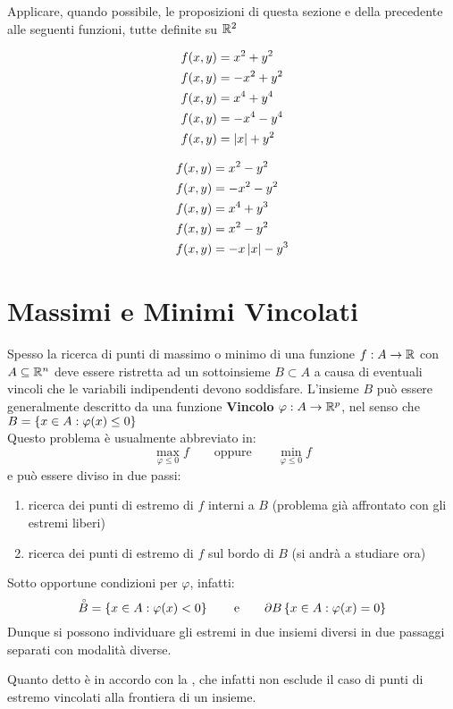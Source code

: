 \begin{exercise}
	Applicare, quando possibile, le proposizioni di questa sezione e della precedente alle seguenti funzioni, tutte definite su $\mathbb{R}^2$\\
	\begin{minipage}{0.49\linewidth}
		\begin{align*}
			f(x,y) &= x^2 + y^2\\
			f(x,y) &= -x^2 + y^2\\
			f(x,y) &= x^4 + y^4\\
			f(x,y) &= -x^4 - y^4\\
			f(x,y) &= \left|x\right| + y^2
		\end{align*}
	\end{minipage}
	\begin{minipage}{0.49\linewidth}
		\begin{align*}
			f(x,y) &= x^2 - y^2\\
			f(x,y) &= -x^2 - y^2\\
			f(x,y) &= x^4 + y^3\\
			f(x,y) &= x^2 - y^2\\
			f(x,y) &= -x \left|x\right| - y^3
		\end{align*}
	\end{minipage}
\end{exercise}

\newpage
\section{Massimi e Minimi Vincolati}
Spesso la ricerca di punti di massimo o minimo di una funzione $f:A \to \mathbb{R}$ con $A \subseteq \mathbb{R}^n$ deve essere ristretta ad un sottoinsieme $B \subset A$ a causa di eventuali vincoli che le variabili indipendenti devono soddisfare. L'insieme $B$ può essere generalmente descritto da una funzione \textbf{Vincolo} $\varphi: A \to \mathbb{R}^p$, nel senso che $B = \left\{x \in A: \varphi(x) \leq 0\right\}$\\
Questo problema è usualmente abbreviato in:
\[\max\limits_{\varphi \leq 0} f \qquad \text{oppure} \qquad \min\limits_{\varphi \leq 0} f\]
e può essere diviso in due passi:
\begin{enumerate}
	\item ricerca dei punti di estremo di $f$ interni a $B$ (problema già affrontato con gli estremi liberi)
	\item ricerca dei punti di estremo di $f$ sul bordo di $B$ (si andrà a studiare ora)
\end{enumerate}
Sotto opportune condizioni per $\varphi$, infatti:
\[\accentset{\circ}{B} = \left\{x\in A: \varphi(x) < 0\right\} \qquad \text{e} \qquad \partial B\left\{x\in A: \varphi(x) = 0\right\}\]
Dunque si possono individuare gli estremi in due insiemi diversi in due passaggi separati con modalità diverse.
\begin{note}
	Quanto detto è in accordo con la , che infatti non esclude il caso di punti di estremo vincolati alla frontiera di un insieme.
\end{note}

